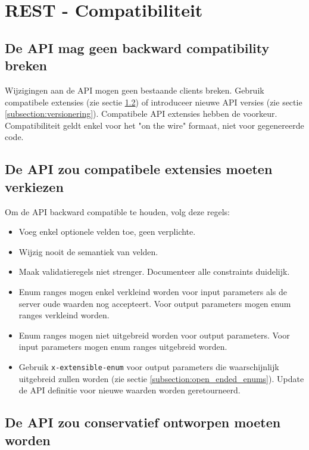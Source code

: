 \section{REST - Compatibiliteit}

\subsection{De API mag geen backward compatibility breken}
\label{subsection:backward_compatibility}

Wijzigingen aan de API mogen geen bestaande clients breken. Gebruik compatibele extensies (zie sectie \ref{subsection:compatible_extensions}) of introduceer nieuwe API versies (zie sectie \ref{subsection:versionering}). Compatibele API extensies hebben de voorkeur. Compatibiliteit geldt enkel voor het "on the wire" formaat, niet voor gegenereerde code.

\subsection{De API zou compatibele extensies moeten verkiezen}
\label{subsection:compatible_extensions}

Om de API backward compatible te houden, volg deze regels:

\begin{itemize}
    \item Voeg enkel optionele velden toe, geen verplichte.
    \item Wijzig nooit de semantiek van velden.
    \item Maak validatieregels niet strenger. Documenteer alle constraints duidelijk.
    \item Enum ranges mogen enkel verkleind worden voor input parameters als de server oude waarden nog accepteert. Voor output parameters mogen enum ranges verkleind worden.
    \item Enum ranges mogen niet uitgebreid worden voor output parameters. Voor input parameters mogen enum ranges uitgebreid worden.
    \item Gebruik \texttt{x-extensible-enum} voor output parameters die waarschijnlijk uitgebreid zullen worden (zie sectie \ref{subsection:open_ended_enums}). Update de API definitie voor nieuwe waarden worden geretourneerd.
\end{itemize}

\subsection{De API zou conservatief ontworpen moeten worden}
\label{subsection:conservatief_ontwerp}

